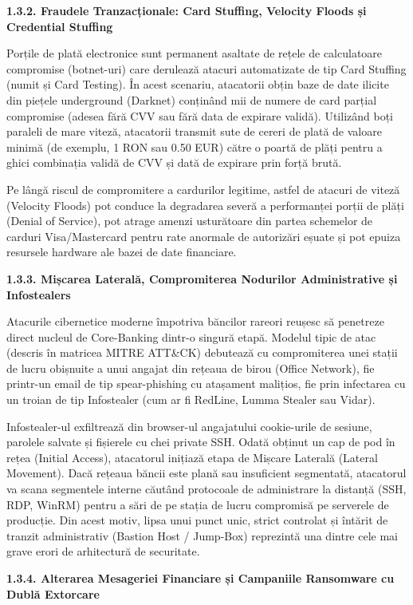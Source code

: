 \documentclass[
]{article}
\begin{document}
\textbf{1.3.2. Fraudele Tranzacționale: Card Stuffing, Velocity Floods
și Credential Stuffing}

Porțile de plată electronice sunt permanent asaltate de rețele de
calculatoare compromise (botnet-uri) care derulează atacuri automatizate
de tip Card Stuffing (numit și Card Testing). În acest scenariu,
atacatorii obțin baze de date ilicite din piețele underground (Darknet)
conținând mii de numere de card parțial compromise (adesea fără CVV sau
fără data de expirare validă). Utilizând boți paraleli de mare viteză,
atacatorii transmit sute de cereri de plată de valoare minimă (de
exemplu, 1 RON sau 0.50 EUR) către o poartă de plăți pentru a ghici
combinația validă de CVV și dată de expirare prin forță brută.

Pe lângă riscul de compromitere a cardurilor legitime, astfel de atacuri
de viteză (Velocity Floods) pot conduce la degradarea severă a
performanței porții de plăți (Denial of Service), pot atrage amenzi
usturătoare din partea schemelor de carduri Visa/Mastercard pentru rate
anormale de autorizări eșuate și pot epuiza resursele hardware ale bazei
de date financiare.

\textbf{1.3.3. Mișcarea Laterală, Compromiterea Nodurilor Administrative
și Infostealers}

Atacurile cibernetice moderne împotriva băncilor rareori reușesc să
penetreze direct nucleul de Core-Banking dintr-o singură etapă. Modelul
tipic de atac (descris în matricea MITRE ATT\&CK) debutează cu
compromiterea unei stații de lucru obișnuite a unui angajat din rețeaua
de birou (Office Network), fie printr-un email de tip spear-phishing cu
atașament malițios, fie prin infectarea cu un troian de tip Infostealer
(cum ar fi RedLine, Lumma Stealer sau Vidar).

Infostealer-ul exfiltrează din browser-ul angajatului cookie-urile de
sesiune, parolele salvate și fișierele cu chei private SSH. Odată
obținut un cap de pod în rețea (Initial Access), atacatorul inițiază
etapa de Mișcare Laterală (Lateral Movement). Dacă rețeaua băncii este
plană sau insuficient segmentată, atacatorul va scana segmentele interne
căutând protocoale de administrare la distanță (SSH, RDP, WinRM) pentru
a sări de pe stația de lucru compromisă pe serverele de producție. Din
acest motiv, lipsa unui punct unic, strict controlat și întărit de
tranzit administrativ (Bastion Host / Jump-Box) reprezintă una dintre
cele mai grave erori de arhitectură de securitate.

\textbf{1.3.4. Alterarea Mesageriei Financiare și Campaniile Ransomware
cu Dublă Extorcare}
\end{document}
